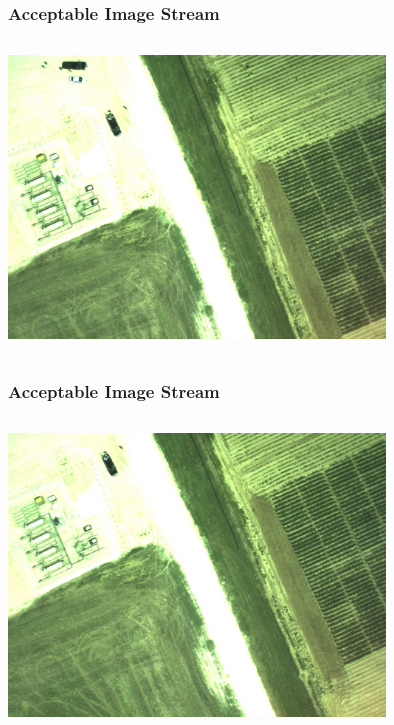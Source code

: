 \documentclass{beamer}
\begin{document}
\begin{frame}
\frametitle{Acceptable Image Stream}
\begin{columns}
\begin{centering}
\includegraphics[width = 10cm]{Figures/good1}
\end{centering}
\end{columns}
\end{frame}


\begin{frame} [noframenumbering]
\frametitle{Acceptable Image Stream}
\begin{columns}
\begin{centering}
\includegraphics[width = 10cm]{Figures/good2}
\end{centering}
\end{columns}
\end{frame}
\end{document}
